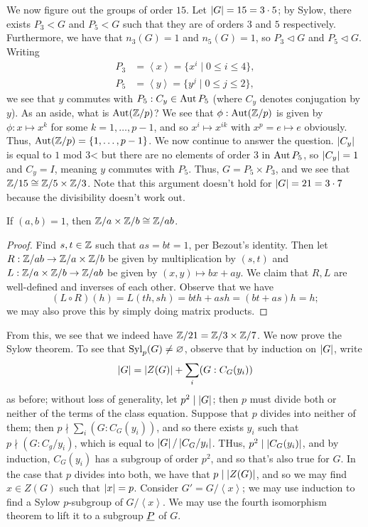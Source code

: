 \noindent We now figure out the groups of order $15$. Let $\left\lvert G \right\rvert = 15 = 3 \cdot 5$; by Sylow, there exists $P_3 < G$ and $P_5 < G$ such that they are of orders $3$ and $5$ respectively. Furthermore, we have that $n_3(G) = 1$ and $n_5(G) = 1$, so $P_3 \lhd G$ and $P_5 \lhd G$. Writing
\begin{align*}
    P_3 &= \left<x\right> = \{x^i \mid 0 \leq i \leq 4\}, \\
    P_5 &= \left<y\right> = \{y^j \mid 0 \leq j \leq 2\},
\end{align*}
we see that $y$ commutes with $P_5 : C_y \in \operatorname{Aut} P_5$ (where $C_y$ denotes conjugation by $y$). As an aside, what is $\operatorname{Aut}(\mathbb Z/p)$? We see that $\phi : \operatorname{Aut}(\mathbb Z/p)$ is given by $\phi : x \mapsto x^k$ for some $k = 1, \dots, p-1$, and so $x^i \mapsto x^{ik}$ with $x^p = e \mapsto e$ obviously. Thus, $\operatorname{Aut}(\mathbb Z/p) = \{1 , \dots, p-1\}$. We now continue to answer the question. $\left\lvert C_y \right\rvert$ is equal to $1$ mod $3$< but there are no elements of order $3$ in $\operatorname{Aut} P_5$, so $\left\lvert C_y \right\rvert = 1$ and $C_y = I$, meaning $y$ commutes with $P_5$. Thus, $G = P_5 \times P_3$, and we see that $\mathbb Z/15 \cong \mathbb Z/5 \times \mathbb Z/3$. Note that this argument doesn't hold for $\left\lvert G \right\rvert = 21 = 3 \cdot 7$ because the divisibility doesn't work out.
\begin{theorem}
    If $(a, b) = 1$, then $\mathbb Z/a \times \mathbb Z/b \cong \mathbb Z/ab$.
\end{theorem}
\begin{proof}
    Find $s, t \in \mathbb Z$ such that $as = bt = 1$, per Bezout's identity. Then let $R : \mathbb Z/{ab} \to \mathbb Z/a \times \mathbb Z/b$ be given by multiplication by $(s, t)$ and $L : \mathbb Z/a \times \mathbb Z/b \to \mathbb Z/ab$ be given by $(x, y) \mapsto bx + ay$. We claim that $R, L$ are well-defined and inverses of each other. Observe that we have
    \[ (L \circ R)(h) = L(th, sh) = bth + ash = (bt + as)h = h; \]
    we may also prove this by simply doing matrix products.
\end{proof}
\noindent From this, we see that we indeed have $\mathbb Z/{21} = \mathbb Z/3 \times \mathbb Z/7$. We now prove the Sylow theorem. To see that $\operatorname{Syl}_p(G) \neq \varnothing$, observe that by induction on $\left\lvert G \right\rvert$, write
\[ \left\lvert G \right\rvert = \left\lvert Z(G) \right\rvert + \sum_i (G : C_G(y_i)) \]
as before; without loss of generality, let $p^2 \mid \left\lvert G \right\rvert$; then $p$ must divide both or neither of the terms of the class equation. Suppose that $p$ divides into neither of them; then $p \nmid \sum_i (G : C_G(y_i))$, and so there exists $y_i$ such that $p \nmid (G : C_g / y_i)$, which is equal to $\left\lvert G \right\rvert / \left\lvert C_G / y_i \right\rvert$. THus, $ p^2 \mid \left\lvert C_G(y_i) \right\rvert$, and by induction, $C_G(y_i)$ has a subgroup of order $p^2$, and so that's also true for $G$. In the case that $p$ divides into both, we have that $p \mid \left\lvert Z(G) \right\rvert$, and so we may find $x \in Z(G)$ such that $\left\lvert x \right\rvert = p$. Consider $G' = G/\left<x\right>$; we may use induction to find a Sylow $p$-subgroup of $G/\left<x\right>$. We may use the fourth isomorphism theorem to lift it to a subgroup $\underline P$ of $G$.
